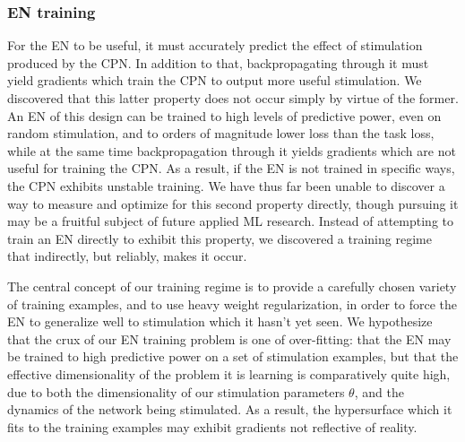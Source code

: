 \documentclass[12pt]{iopart}
\begin{document}
\subsubsection{EN training}
For the EN to be useful, it must accurately predict the effect of stimulation
produced by the CPN. In addition to that, backpropagating through it must yield
gradients which train the CPN to output more useful stimulation. We discovered that
this latter property does not occur simply by virtue of the former.
An EN of this design can be trained to high levels of predictive power, even
on random stimulation, and to orders of magnitude lower loss than the task loss,
while at the same time backpropagation through it yields gradients which are not
useful for training the CPN. As a result, if the EN is not trained in specific ways,
the CPN exhibits unstable training. We have thus far been unable to discover a way
to measure and optimize for this second property directly, though pursuing it may be a
fruitful subject of future applied ML research. Instead of attempting to train an EN
directly to exhibit this property, we discovered a training regime that indirectly,
but reliably, makes it occur.

The central concept of our training regime is to provide a carefully chosen variety of
training examples, and to use heavy weight regularization, in order to force
the EN to generalize well to stimulation which it hasn't yet seen. We hypothesize that
the crux of our EN training problem is one of over-fitting: that the EN may be trained
to high predictive power on a set of stimulation examples, but that the effective
dimensionality of the problem it is learning is comparatively quite high, due to both
the dimensionality of our stimulation parameters $\theta$, and the dynamics of the
network being stimulated. As a result, the hypersurface which it fits to the training
examples may exhibit gradients not reflective of reality.
\end{document}
